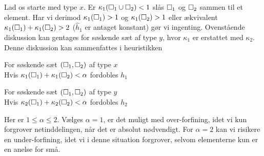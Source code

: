 Lad os starte med type $x$. Er $\kappa_1(\Box_1\cup\Box_2)<1$ slås
$\Box_1$ og $\Box_2$ sammen til et element. Har vi derimod
$\kappa_1(\Box_1)>1$ og $\kappa_1(\Box_2)>1$ eller ækvivalent
$\kappa_1(\Box_1)+\kappa_1(\Box_2)>2$ ($\hat{h}_1$ er antaget konstant)
gør vi ingenting. Ovenstående diskussion kan gentages for søskende sæt
af type $y$, hvor $\kappa_1$ er erstattet med $\kappa_2$. Denne
diskussion kan sammenfattes i heuristikken

\begin{ttitemize}
  \item For søskende sæt $(\Box_1,\Box_2)$ af type $x$ \\
        \makebox[.25in][r]{} Hvis $\kappa_1(\Box_1)+\kappa_1(\Box_2)<\alpha$
        fordobles $h_1$
  \item For søskende sæt $(\Box_1,\Box_2)$ af type $y$ \\
        \makebox[.25in][r]{} Hvis $\kappa_2(\Box_1)+\kappa_2(\Box_2)<\alpha$   
        fordobles $h_2$
\end{ttitemize}
Her er $1\leq\alpha\leq 2$. Vælges $\alpha =1$, er det muligt med
over-forfining, idet vi kun forgrover netinddelingen, når det er absolut
nødvendigt. For $\alpha =2$ kan vi risikere en under-forfining, idet
vi i denne situation forgrover, selvom elementerne kun er en anelse for
små.

